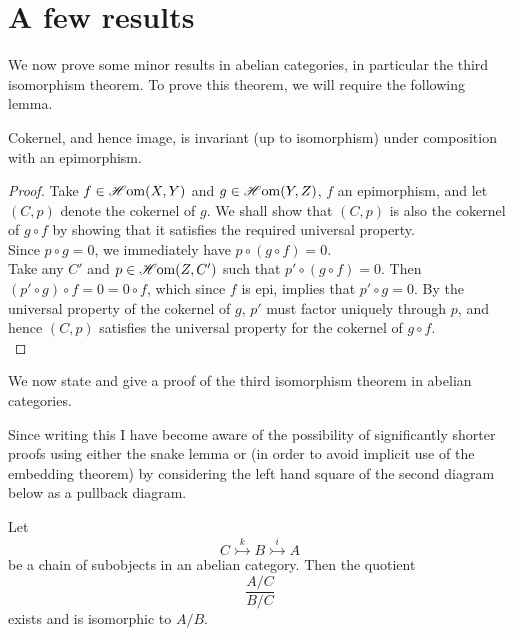 \documentclass[a4paper]{article}
\def\mono{\rightarrowtail}
\begin{document}
\section{A few results}
We now prove some minor results in abelian categories, in particular the third isomorphism theorem. To prove this theorem, we will require the following lemma.
\begin{Lemma}
    Cokernel, and hence image, is invariant (up to isomorphism) under composition with an epimorphism.
\end{Lemma}
\begin{proof}
    Take $f \in \operatorname{\mathscr{H}om}(X,Y)$ and $g \in \operatorname{\mathscr{H}om}(Y,Z)$, $f$ an epimorphism, and let $(C,p)$ denote the cokernel of $g$. We shall show that $(C,p)$ is also the cokernel of $g\circ f$ by showing that it satisfies the required universal property.\\
    Since $p\circ g = 0$, we immediately have $p \circ (g\circ f) = 0$.\\
    Take any $C'$ and $p\in \operatorname{\mathscr{H}om}(Z, C')$ such that $p' \circ (g\circ f) = 0$. Then $(p' \circ g) \circ f = 0 = 0 \circ f$, which since $f$ is epi, implies that $p' \circ g = 0$. By the universal property of the cokernel of $g$, $p'$ must factor uniquely through $p$, and hence $(C,p)$ satisfies the universal property for the cokernel of $g \circ f$.\\
\end{proof}
We now state and give a proof of the third isomorphism theorem in abelian categories.
\begin{Note}
    {Since writing this I have become aware of the possibility of significantly shorter proofs using either the snake lemma or (in order to avoid implicit use of the embedding theorem) by considering the left hand square of the second diagram below as a pullback diagram.}
\end{Note}
\begin{Theorem}
    Let
    \[
        C \stackrel{k}{\mono} B \stackrel{i}{\mono} A
    \]
    be a chain of subobjects in an abelian category. Then the quotient
    \[
        \frac{A/C}{B/C}
    \]
    exists and is isomorphic to $A/B$.
\end{Theorem}
\end{document}
